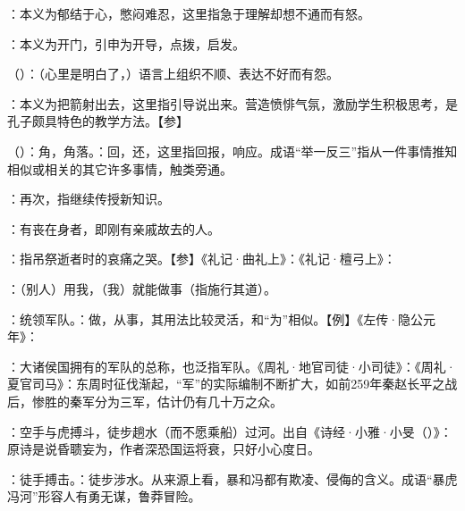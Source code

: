 {
\item {}：本义为郁结于心，憋闷难忍，这里指急于理解却想不通而有怒。

：本义为开门，引申为开导，点拨，启发。

\item {}（）：（心里是明白了，）语言上组织不顺、表达不好而有怨。

：本义为把箭射出去，这里指引导说出来。营造愤悱气氛，激励学生积极思考，是孔子颇具特色的教学方法。【参】

\item {}（）：角，角落。：回，还，这里指回报，响应。成语“举一反三”指从一件事情推知相似或相关的其它许多事情，触类旁通。
\item {}：再次，指继续传授新知识。
}
{}


{
\item {}：有丧在身者，即刚有亲戚故去的人。%
}
{}


{
\item {}：指吊祭逝者时的哀痛之哭。【参】《礼记·曲礼上》：《礼记·檀弓上》：
}
{}


{
\item {}：（别人）用我，（我）就能做事（指施行其道）。

\item {}：统领军队。：做，从事，其用法比较灵活，和“为”相似。【例】《左传·隐公元年》：

：大诸侯国拥有的军队的总称，也泛指军队。《周礼·地官司徒·小司徒》：《周礼·夏官司马》：东周时征伐渐起，“军”的实际编制不断扩大，如前259年秦赵长平之战后，惨胜的秦军分为三军，估计仍有几十万之众。 %

\item {}：空手与虎搏斗，徒步趟水（而不愿乘船）过河。出自《诗经·小雅·小旻（）》：原诗是说昏聩妄为，作者深恐国运将衰，只好小心度日。

：徒手搏击。：徒步涉水。从来源上看，暴和冯都有欺凌、侵侮的含义。成语“暴虎冯河”形容人有勇无谋，鲁莽冒险。
}
{}


